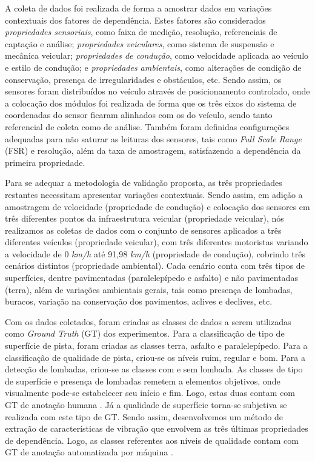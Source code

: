 A coleta de dados foi realizada de forma a amostrar dados em variações contextuais dos fatores de dependência. Estes fatores são considerados \emph{propriedades sensoriais}, como faixa de medição, resolução, referenciais de captação e análise; \emph{propriedades veiculares}, como sistema de suspensão e mecânica veicular; \emph{propriedades de condução}, como velocidade aplicada ao veículo e estilo de condução; e \emph{propriedades ambientais}, como alterações de condição de conservação, presença de irregularidades e obstáculos, etc. Sendo assim, os sensores foram distribuídos no veículo através de posicionamento controlado, onde a colocação dos módulos foi realizada de forma que os três eixos do sistema de coordenadas do sensor ficaram alinhados com os do veículo, sendo tanto referencial de coleta como de análise. Também foram definidas configurações adequadas para não saturar as leituras dos sensores, tais como \textit{Full Scale Range} (FSR) e resolução, além da taxa de amostragem, satisfazendo a dependência da primeira propriedade.

Para se adequar a metodologia de validação proposta, as três propriedades restantes necessitam apresentar variações contextuais. Sendo assim, em adição a amostragem de velocidade (propriedade de condução) e colocação dos sensores em três diferentes pontos da infraestrutura veicular (propriedade veicular), nós realizamos as coletas de dados com o conjunto de sensores aplicados a três diferentes veículos (propriedade veicular), com três diferentes motoristas variando a velocidade de 0 \emph{km/h} até 91,98 \emph{km/h} (propriedade de condução), cobrindo três cenários distintos (propriedade ambiental). Cada cenário conta com três tipos de superfícies, dentre pavimentadas (paralelepípedo e asfalto) e não pavimentadas (terra), além de variações ambientais gerais, tais como presença de lombadas, buracos, variação na conservação dos pavimentos, aclives e declives, etc.

Com os dados coletados, foram criadas as classes de dados a serem utilizadas como \textit{Ground Truth} (GT) dos experimentos. Para a classificação de tipo de superfície de pista, foram criadas as classes terra, asfalto e paralelepípedo. Para a classificação de qualidade de pista, criou-se os níveis ruim, regular e bom. Para a detecção de lombadas, criou-se as classes com e sem lombada. As classes de tipo de superfície e presença de lombadas remetem a elementos objetivos, onde visualmente pode-se estabelecer seu início e fim. Logo, estas duas contam com GT de anotação humana \cite{Krig2014}. Já a qualidade de superfície torna-se subjetiva se realizada com este tipo de GT. Sendo assim, desenvolvemos um método de extração de características de vibração que envolvem as três últimas propriedades de dependência. Logo, as classes referentes aos níveis de qualidade contam com GT de anotação automatizada por máquina \cite{Krig2014}.

